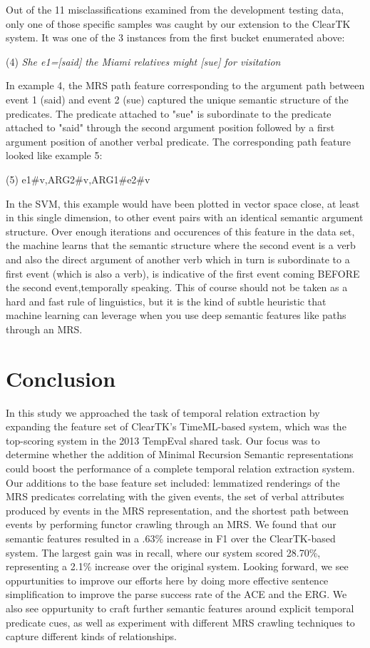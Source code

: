 \documentclass[11pt]{article}
\begin{document}
Out of the 11 misclassifications examined from the development testing data, only one of those specific samples was caught by our extension to the ClearTK system. It was one of the 3 instances from the first bucket enumerated above:

(4) \textit{She e1=[said] the Miami relatives might [sue] for visitation}

In example 4, the MRS path feature corresponding to the argument path between event 1 (said) and event 2 (sue) captured the unique semantic structure of the predicates. The predicate attached to "sue" is subordinate to the predicate attached to "said" through the second argument position followed by a first argument position of another verbal predicate. The corresponding path feature looked like example 5:

\begin{center}(5) e1\#v,ARG2\#v,ARG1\#e2\#v\end{center}

In the SVM, this example would have been plotted in vector space close, at least in this single dimension, to other event pairs with an identical semantic argument structure. Over enough iterations and occurences of this feature in the data set, the machine learns that the semantic structure where the second event is a verb and also the direct argument of another verb which in turn is subordinate to a first event (which is also a verb), is indicative of the first event coming BEFORE the second event,temporally speaking. This of course should not be taken as a hard and fast rule of linguistics, but it is the kind of subtle heuristic that machine learning can leverage when you use deep semantic features like paths through an MRS.   

\section{Conclusion}
In this study we approached the task of temporal relation extraction by expanding the feature set of ClearTK's TimeML-based system, which was the top-scoring system in the 2013 TempEval shared task. Our focus was to determine whether the addition of Minimal Recursion Semantic representations could boost the performance of a complete temporal relation extraction system. Our additions to the base feature set included: lemmatized renderings of the MRS predicates correlating with the given events, the set of verbal attributes produced by events in the MRS representation, and the shortest path between events by performing functor crawling through an MRS. We found that our semantic features resulted in a .63\% increase in F1 over the ClearTK-based system. The largest gain was in recall, where our system scored 28.70\%, representing a 2.1\% increase over the original system. Looking forward, we see oppurtunities to improve our efforts here by doing more effective sentence simplification to improve the parse success rate of the ACE and the ERG. We also see oppurtunity to craft further semantic features around explicit temporal predicate cues, as well as experiment with different MRS crawling techniques to capture different kinds of relationships.
\end{document}
